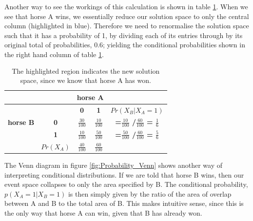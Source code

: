 \documentclass[11pt,fullpage]{book}
\begin{document}
Another way to see the workings of this calculation is shown in table \ref{tab:Probability_coinsConditionalDiscrete}. When we see that horse A wins, we essentially reduce our solution space to only the central column (highlighted in blue). Therefore we need to renormalise the solution space such that it has a probability of 1, by dividing each of its entries through by its original total of probabilities, 0.6; yielding the conditional probabilities shown in the right hand column of table \ref{tab:Probability_coinsConditionalDiscrete}.

\begin{table}[htbp]
  \centering
    \begin{tabular}{rrccr}
    \toprule
          &       & \multicolumn{2}{c}{\textbf{horse A}} &  \\
    \midrule
          &       & \textbf{0} & \textbf{1} & \multicolumn{1}{c}{\textbf{$Pr(X_B|X_A=1)$}} \\
    \multicolumn{1}{c}{\textbf{horse B}} & \multicolumn{1}{c}{\textbf{0}} & $\frac{30}{100}$   & {\color{blue}$\frac{10}{100}$ }   & \multicolumn{1}{c}{\textbf{=$\frac{10}{100}$ /$\frac{60}{100}$  = $\frac{1}{6}$ }} \\
    \multicolumn{1}{c}{} & \multicolumn{1}{c}{\textbf{1}} & $\frac{10}{100}$   & {\color{blue}$\frac{50}{100}$ }   & \multicolumn{1}{c}{\textbf{=$\frac{50}{100}$ /$\frac{60}{100}$  = $\frac{5}{6}$ }} \\
          & \multicolumn{1}{c}{\textbf{$Pr(X_A)$}} & \textbf{$\frac{40}{100}$ } & {\color{blue}\textbf{$\frac{60}{100}$ }} & \multicolumn{1}{c}{} \\
    \bottomrule
    \end{tabular}%
\caption{The highlighted region indicates the new solution space, since we know that horse A has won.}
\label{tab:Probability_coinsConditionalDiscrete}
\end{table}

The Venn diagram in figure \ref{fig:Probability_Venn} shows another way of interpreting conditional distributions. If we are told that horse B wins, then our event space collapses to only the area specified by B. The conditional probability, $p(X_A=1|X_B=1)$ is then simply given by the ratio of the area of overlap between A and B to the total area of B. This makes intuitive sense, since this is the only way that horse A can win, given that B has already won.
\end{document}
